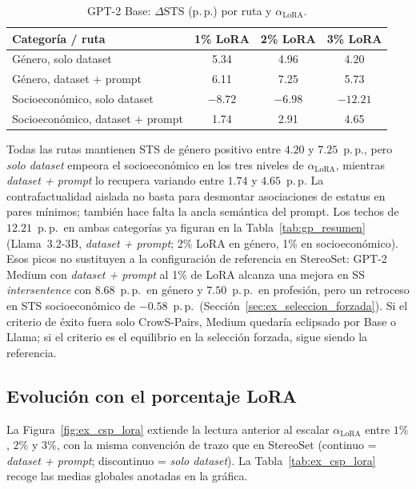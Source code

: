 \documentclass[12pt,a4paper]{report}
\newcommand{\dSTS}{\ensuremath{\Delta\mathrm{STS}}}
\newcommand{\aLoRA}{\ensuremath{\alpha_{\mathrm{LoRA}}}}
\begin{document}
\begin{table}[H]
\centering\small
\caption{GPT-2 Base: $\dSTS$ (p.\,p.) por ruta y \aLoRA{}.}
\label{tab:ex_csp_base}
\begin{tabular}{@{}lccc@{}}
\toprule
\textbf{Categoría / ruta} & \textbf{1\% LoRA} & \textbf{2\% LoRA} & \textbf{3\% LoRA} \\
\midrule
Género, solo dataset & 5.34 & 4.96 & 4.20 \\
Género, dataset + prompt & 6.11 & 7.25 & 5.73 \\
Socioeconómico, solo dataset & $-8.72$ & $-6.98$ & $-12.21$ \\
Socioeconómico, dataset + prompt & 1.74 & 2.91 & 4.65 \\
\bottomrule
\end{tabular}
\end{table}

Todas las rutas mantienen STS de género positivo entre $4.20$ y $7.25$~p.\,p., pero \textit{solo dataset} empeora el socioeconómico en los tres niveles de \aLoRA{}, mientras \textit{dataset + prompt} lo recupera variando entre $1.74$ y $4.65$~p.\,p. La contrafactualidad aislada no basta para desmontar asociaciones de estatus en pares mínimos; también hace falta la ancla semántica del prompt. Los techos de $12.21$~p.\,p.\ en ambas categorías ya figuran en la Tabla~\ref{tab:gp_resumen} (Llama~3.2-3B, \textit{dataset + prompt}; 2\% LoRA en género, 1\% en socioeconómico). Esos picos no sustituyen a la configuración de referencia en StereoSet: GPT-2 Medium con \textit{dataset + prompt} al 1\% de LoRA alcanza una mejora en SS \textit{intersentence} con $8.68$~p.\,p.\ en género y $7.50$~p.\,p.\ en profesión, pero un retroceso en STS socioeconómico de $-0.58$~p.\,p.\ (Sección~\ref{sec:ex_seleccion_forzada}). Si el criterio de éxito fuera solo CrowS-Pairs, Medium quedaría eclipsado por Base o Llama; si el criterio es el equilibrio en la selección forzada, sigue siendo la referencia.

\subsection{Evolución con el porcentaje LoRA}
\label{subsec:ex_csp_lora}

La Figura~\ref{fig:ex_csp_lora} extiende la lectura anterior al escalar \aLoRA{} entre $1\%$, $2\%$ y $3\%$, con la misma convención de trazo que en StereoSet (continuo = \textit{dataset + prompt}; discontinuo = \textit{solo dataset}). La Tabla~\ref{tab:ex_csp_lora} recoge las medias globales anotadas en la gráfica.
\end{document}
